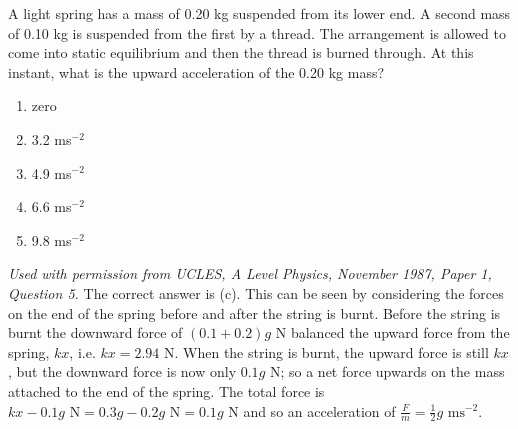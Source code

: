 \begin{problem} 
{A light spring has a mass of 0.20 kg suspended from its lower end. A second mass of 0.10 kg is suspended from the first by a thread. The arrangement is allowed to come into static equilibrium and then the thread is burned through. At this instant, what is the upward acceleration of the 0.20 kg mass?
\begin{enumerate}
	\item zero
	\item 3.2 ms$^{-2}$
	\item 4.9 ms$^{-2}$
	\item 6.6 ms$^{-2}$
	\item 9.8 ms$^{-2}$
\end{enumerate}
}
{\textit{Used with permission from UCLES, A Level Physics, November 1987, Paper 1, Question 5.}}
{The correct answer is (c). This can be seen by considering the forces on the end of the spring before and after the string is burnt. Before the string is burnt the downward force of $(0.1 + 0.2)g \textrm{ N}$ balanced the upward force from the spring, $kx$, i.e. $kx = 2.94 \textrm{ N}$. When the string is burnt, the upward force is still $kx$, but the downward force is now only $0.1g \textrm{ N}$; so a net force upwards on the mass attached to the end of the spring. The total force is $kx-0.1g \textrm{ N} = 0.3g - 0.2g \textrm{ N} = 0.1g \textrm{ N}$ and so an acceleration of $\frac{F}{m} = \frac{1}{2}g \textrm{ ms}^{-2} $.
}
\end{problem}